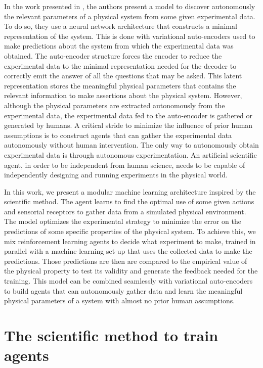 \documentclass[11pt,a4paper,twoside]{report}
\newcommand{\+}{\textnormal{+} }
\theoremstyle{definition}
\numberwithin{equation}{chapter}
\begin{document}
\par In the work presented in \cite{iten2020discovering}, the authors
present a model to discover autonomously the relevant parameters of a physical
system from some given experimental data. To do so, they use a neural network
architecture that constructs a minimal representation of the system. This is
done with variational auto-encoders used to make predictions about the
system from which the experimental data was obtained. The auto-encoder structure
forces the encoder to reduce the experimental data to the minimal representation
needed for the decoder to correctly emit the answer of all the questions that
may be asked. This latent representation stores the meaningful physical
parameters that contains the relevant information to make assertions about
the physical system. However, although the physical parameters are extracted
autonomously from the experimental data, the experimental data fed to the
auto-encoder is gathered or generated by humans. A critical stride to minimize
the influence of prior human assumptions is to construct agents that can gather
the experimental data autonomously without human intervention. The only way to
autonomously obtain experimental data is through autonomous experimentation. An
artificial scientific agent, in order to be independent from human science,
needs to be capable of independently designing and running experiments in the
physical world.

\par In this work, we present a modular machine learning architecture inspired
by the scientific method. The agent learns to find the optimal use of some given
actions and sensorial receptors to gather data from a simulated physical
environment. The model optimizes the experimental strategy to minimize the error
on the predictions of some specific properties of the physical system. To
achieve this, we mix reinforcement learning agents to decide what experiment to
make, trained in parallel with a machine learning set-up that uses the collected
data to make the predictions. Those predictions are then are compared to the
empirical value of the physical property to test its validity and generate the
feedback needed for the training. This model can be combined seamlessly with
variational auto-encoders to build agents that can autonomously gather data and
learn the meaningful physical parameters of a system with almost no prior human
assumptions.

\section{The scientific method to train agents}
\end{document}

